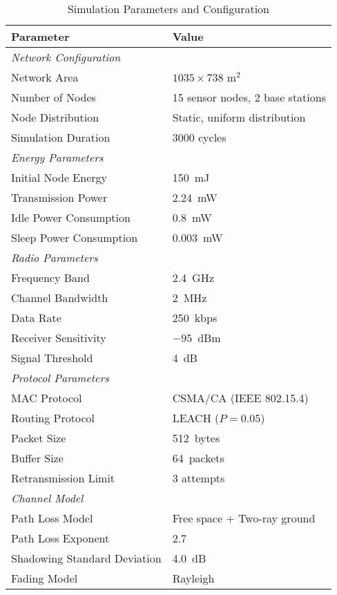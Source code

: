 \documentclass[conference]{IEEEtran}
\begin{document}
\begin{table}[h!]
\caption{Simulation Parameters and Configuration}
\label{table:sim_params}
\centering
\begin{tabular}{|l|l|}
\hline
\textbf{Parameter} & \textbf{Value} \\
\hline
\multicolumn{2}{|l|}{\textit{Network Configuration}} \\
\hline
Network Area & $1035 \times 738$ m$^2$ \\
Number of Nodes & 15 sensor nodes, 2 base stations \\
Node Distribution & Static, uniform distribution \\
Simulation Duration & 3000 cycles \\
\hline
\multicolumn{2}{|l|}{\textit{Energy Parameters}} \\
\hline
Initial Node Energy & 150~mJ \\
Transmission Power & 2.24~mW \\
Idle Power Consumption & 0.8~mW \\
Sleep Power Consumption & 0.003~mW \\
\hline
\multicolumn{2}{|l|}{\textit{Radio Parameters}} \\
\hline
Frequency Band & 2.4~GHz \\
Channel Bandwidth & 2~MHz \\
Data Rate & 250~kbps \\
Receiver Sensitivity & $-95$~dBm \\
Signal Threshold & 4~dB \\
\hline
\multicolumn{2}{|l|}{\textit{Protocol Parameters}} \\
\hline
MAC Protocol & CSMA/CA (IEEE 802.15.4) \\
Routing Protocol & LEACH ($P = 0.05$) \\
Packet Size & 512~bytes \\
Buffer Size & 64~packets \\
Retransmission Limit & 3 attempts \\
\hline
\multicolumn{2}{|l|}{\textit{Channel Model}} \\
\hline
Path Loss Model & Free space + Two-ray ground \\
Path Loss Exponent & 2.7 \\
Shadowing Standard Deviation & 4.0~dB \\
Fading Model & Rayleigh \\
\hline
\end{tabular}

\label{table:sim_params}
\end{table}
\end{document}
